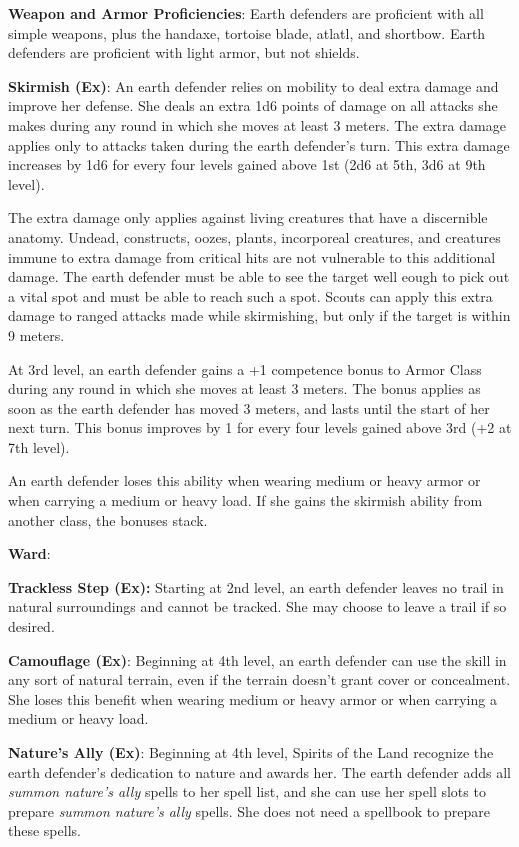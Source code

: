 {
\textbf{Weapon and Armor Proficiencies}: Earth defenders are proficient with all simple  weapons, plus the handaxe, tortoise blade, atlatl, and shortbow. Earth defenders are proficient with light armor, but not shields.

\textbf{Skirmish (Ex)}: An earth defender relies on mobility to deal extra damage and improve her defense. She deals an extra 1d6 points of damage on all attacks she makes during any round in which she moves at least 3 meters. The extra damage applies only to attacks taken during the earth defender's turn. This extra damage increases by 1d6 for every four levels gained above 1st (2d6 at 5th, 3d6 at 9th level).

The extra damage only applies against living creatures that have a discernible anatomy. Undead, constructs, oozes, plants, incorporeal creatures, and creatures immune to extra damage from critical hits are not vulnerable to this additional damage. The earth defender must be able to see the target well eough to pick out a vital spot and must be able to reach such a spot. Scouts can apply this extra damage to ranged attacks made while skirmishing, but only if the target is within 9 meters.

At 3rd level, an earth defender gains a +1 competence bonus to Armor Class during any round in which she moves at least 3 meters. The bonus applies as soon as the earth defender has moved 3 meters, and lasts until the start of her next turn. This bonus improves by 1 for every four levels gained above 3rd (+2 at 7th level).

An earth defender loses this ability when wearing medium or heavy armor or when carrying a medium or heavy load. If she gains the skirmish ability from another class, the bonuses stack.

\textbf{Ward}:

\textbf{Trackless Step (Ex):} Starting at 2nd level, an earth defender leaves no trail in natural surroundings and cannot be tracked. She may choose to leave a trail if so desired.

\textbf{Camouflage (Ex)}: Beginning at 4th level, an earth defender can use the  skill in any sort of natural terrain, even if the terrain doesn't grant cover or concealment. She loses this benefit when wearing medium or heavy armor or when carrying a medium or heavy load.

\textbf{Nature's Ally (Ex)}: Beginning at 4th level, Spirits of the Land recognize the earth defender's dedication to nature and awards her. The earth defender adds all \emph{summon nature's ally} spells to her spell list, and she can use her spell slots to prepare \emph{summon nature's ally} spells. She does not need a spellbook to prepare these spells.

}
